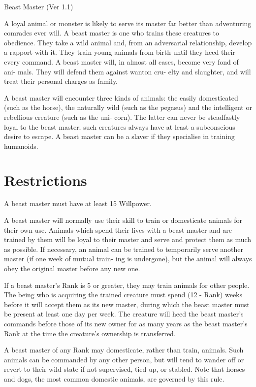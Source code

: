 \begin{Chapter}{Beast Master (Ver 1.1)}

A loyal animal or monster is likely to serve its master far better
than adventuring comrades ever will.  A beast master is one who trains
these creatures to obedience.  They take a wild animal and, from an
adversarial relationship, develop a rapport with it.  They train young
animals from birth until they heed their every command.  A beast
master will, in almost all cases, become very fond of ani- mals.  They
will defend them against wanton cru- elty and slaughter, and will
treat their personal charges as family.

A beast master will encounter three kinds of animals: the easily
domesticated (such as the horse), the naturally wild (such as the
pegasus) and the intelligent or rebellious creature (such as the uni-
corn).  The latter can never be steadfastly loyal to the beast master;
such creatures always have at least a subconscious desire to escape.
A beast master can be a slaver if they specialise in training
humanoids.

\section{Restrictions}

A beast master must have at least 15 Willpower. 

A beast master will normally use their skill to train or domesticate
animals for their own use. Animals which spend their lives with a
beast master and are trained by them will be loyal to their master and
serve and protect them as much as possible.  If necessary, an animal
can be trained to temporarily serve another master (if one week of
mutual train- ing is undergone), but the animal will always obey the
original master before any new one.

If a beast master’s Rank is 5 or greater, they may train animals for
other people.  The being who is acquiring the trained creature must
spend (12 - Rank) weeks before it will accept them as its new master,
during which the beast master must be present at least one day per
week. The creature will heed the beast master’s commands before those
of its new owner for as many years as the beast master’s Rank at the
time the creature’s ownership is transferred.

A beast master of any Rank may domesticate, rather than train,
animals.  Such animals can be commanded by any other person, but will
tend to wander off or revert to their wild state if not supervised,
tied up, or stabled.  Note that horses and dogs, the most common
domestic animals, are governed by this rule.


\end{Chapter}
